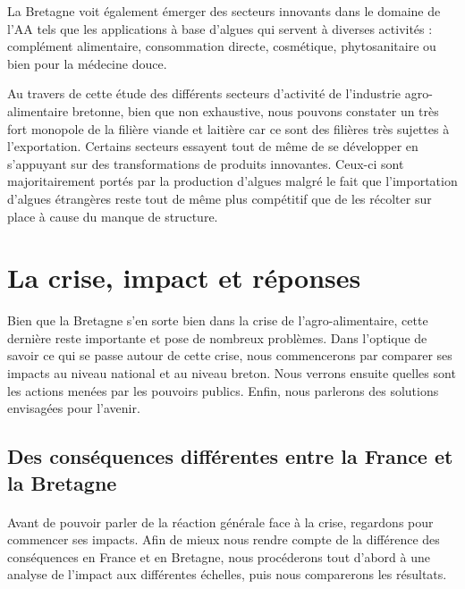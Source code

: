 \documentclass[a4paper,12pt]{report}
\begin{document}
			La Bretagne voit également émerger des secteurs innovants dans le domaine de l’AA tels que les applications à base d’algues qui servent à diverses activités\cite{CartesBretagneAgroAlimentaire20142016} : complément alimentaire, consommation directe, cosmétique, phytosanitaire ou bien pour la médecine douce.
			
			Au travers de cette étude des différents secteurs d’activité de l’industrie agro-alimentaire bretonne, bien que non exhaustive, nous pouvons constater un très fort monopole de la filière viande et laitière car ce sont des filières très sujettes à l’exportation. Certains secteurs essayent tout de même de se développer en s’appuyant sur des transformations de produits innovantes. Ceux-ci sont majoritairement portés par la production d’algues malgré le fait que l’importation d’algues étrangères reste tout de même plus compétitif que de les récolter sur place à cause du manque de structure.
			
			
	\section{La crise, impact et réponses}
		Bien que la Bretagne s’en sorte bien dans la crise de l’agro-alimentaire, cette dernière reste importante et pose de nombreux problèmes. Dans l’optique de savoir ce qui se passe autour de cette crise, nous commencerons par comparer ses impacts au niveau national et au niveau breton. Nous verrons ensuite quelles sont les actions menées par les pouvoirs publics. Enfin, nous parlerons des solutions envisagées pour l’avenir.
		
		\subsection{Des conséquences différentes entre la France et la Bretagne}
			\paragraph{}Avant de pouvoir parler de la réaction générale face à la crise, regardons pour commencer ses impacts. Afin de mieux nous rendre compte de la différence des conséquences en France et en Bretagne, nous procéderons tout d'abord à une analyse de l'impact aux différentes échelles, puis nous comparerons les résultats.
\end{document}
